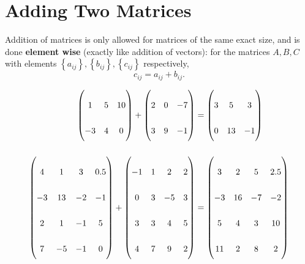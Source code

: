 \section{Adding Two Matrices}
Addition of matrices is only allowed for matrices of the same exact size, and is done \textbf{element wise} (exactly like addition of vectors): for the matrices $A,B,C$ with elements $\left\{ a_{ij} \right\}, \left\{ b_{ij} \right\}, \left\{c_{ij}\right\}$ respectively,
\begin{equation*}
  c_{ij} = a_{ij} + b_{ij}.
\end{equation*}
\begin{example}
  
  \begin{align*}
	\renewcommand{\baselinestretch}{2.5}
	\begin{pmatrix}
	  1 & 5 & 10\\
	  -3 & 4 & 0\\
	\end{pmatrix} +
	\begin{pmatrix}
	  2 & 0 & -7\\
	  3 & 9 & -1\\
	\end{pmatrix} &=
	\begin{pmatrix}
	  3 & 5 & 3\\
	  0 & 13 & -1\\
	\end{pmatrix}\\[5mm]
	\begin{pmatrix}
	  4 & 1 & 3 & 0.5\\
	  -3 & 13 & -2 & -1\\
	  2 & 1 & -1 & 5\\
	  7 & -5 & -1 & 0\\
	\end{pmatrix} + 
	\begin{pmatrix}
	  -1 & 1 & 2 & 2\\
	  0 & 3 & -5 & 3\\
	  3 & 3 & 4 & 5\\
	  4 & 7 & 9 & 2\\
	\end{pmatrix} &=
	\begin{pmatrix}
	  3 & 2 & 5 & 2.5\\
	  -3 & 16 & -7 & -2\\
	  5 & 4 & 3 & 10\\
	  11 & 2 & 8 & 2\\
	\end{pmatrix}\\[5mm]

\end{align*}
\end{example}
